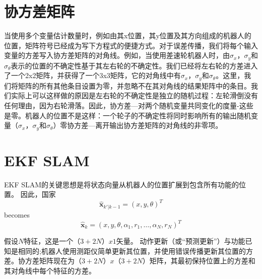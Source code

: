 \section{协方差矩阵}
当使用多个变量估计数量时，例如由其x位置，其y位置及其方向组成的机器人的位置，矩阵符号已经成为写下方程式的便捷方式。对于误差传播，我们将每个输入变量的方差写入协方差矩阵的对角线。例如，当使用差速轮机器人时，由$\sigma_x，\sigma_y $和$\sigma _ {\theta}$表示的位置的不确定性基于其左右轮的不确定性。我们已经将左右轮的方差进入了一个2x2矩阵，并获得了一个3x3矩阵，它的对角线中有$\sigma_x，\sigma_y$和$\sigma_{\theta}$。这里，我们将矩阵的所有其他条目设置为零，并忽略不在其对角线的结果矩阵中的条目。我们实际上可以这样做的原因是左右轮的不确定性是独立的随机过程：左轮滑倒没有任何理由，因为右轮滑落。因此，协方差---对两个随机变量共同变化的度量-这些是零。机器人的位置不是这样：一个轮子的不确定性将同时影响所有的输出随机变量（$\sigma_x，\sigma_y $和$\sigma_{\theta}$）零协方差---离开输出协方差矩阵的对角线的非零项。

\section{EKF SLAM}\label{sec:ekfslam}\label{sec:ekf}
EKF SLAM的关键思想是将状态向量从机器人的位置扩展到包含所有功能的位置。 因此，国家
\begin{equation}
\hat{\boldsymbol{x}}_{k'|k-1}=(x,y,\theta)^T
\end{equation}
becomes
\begin{equation}
\hat{\boldsymbol{x}}_{k}=(x,y,\theta,\alpha_1,r_1,\ldots,\alpha_N,r_N)^T
\end{equation}


假设$ N $特征，这是一个$（3 + 2N）x1 $矢量。 动作更新（或“预测更新”）与功能已知是相同的;机器人使用测距仪简单更新其位置，并使用错误传播更新其位置的方差。协方差矩阵现在为$（3 + 2N）x（3 + 2N）$矩阵，其最初保持位置上的方差和其对角线中每个特征的方差。


